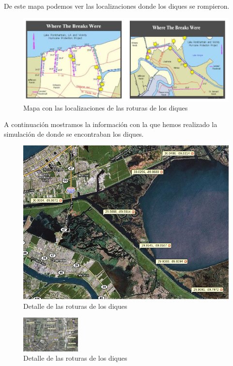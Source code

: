 De este mapa podemos ver las localizaciones donde los diques se rompieron.

\begin{figure}[H]
 \centering
 \includegraphics[width=120mm]{figuras/cap6/dikes.png}
 \caption{Mapa con las localizaciones de las roturas de los diques}
\end{figure}

A continuación mostramos la información con la que hemos realizado la
simulación de donde se encontraban los diques.


\begin{figure}[H]
 \centering
 \includegraphics[width=120mm]{figuras/cap6/dikes1.png}
 \caption{Detalle de las roturas de los diques}
\end{figure}


\begin{figure}[H]
 \centering
 \includegraphics[width=30mm]{figuras/cap6/dikes2.png}
 \caption{Detalle de las roturas de los diques}
\end{figure}

